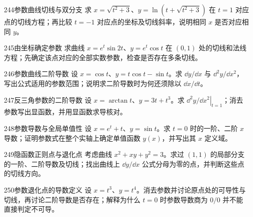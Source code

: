 \begin{exercise}{244}{参数曲线切线与双分支}
求 $x=\sqrt{t^2+3}$、$y=\ln(t+\sqrt{t^2+3})$ 在 $t=1$ 对应点的切线方程；再比较 $t=-1$ 对应点的坐标及切线斜率，说明相同 $x$ 是否对应相同 $y$。
\end{exercise}
\begin{exercise}{245}{由坐标确定参数}
求曲线 $x=e^t\sin2t$、$y=e^t\cos t$ 在 $(0,1)$ 处的切线和法线方程；先确定该点对应的全部实数参数，检查是否存在多条切线。
\end{exercise}
\begin{exercise}{246}{参数曲线二阶导数}
设 $x=\cos t$、$y=t\cos t-\sin t$。求 $\dd y/\dd x$ 与 $\dd^2y/\dd x^2$，写出公式适用的参数范围；说明求二阶导数时为何还须除以 $\dd x/\dd t$。
\end{exercise}
\begin{exercise}{247}{反三角参数的二阶导数}
设 $x=\arctan t$、$y=3t+t^3$。求 $\left.\dd^2y/\dd x^2\right|_{t=1}$；消去参数写出显函数，并用显函数求导核对。
\end{exercise}
\begin{exercise}{248}{参数导数与全局单值性}
设 $x=e^t+t$、$y=\sin t$。求 $t=0$ 时的一阶、二阶 $x$ 导数；证明参数式在整个实轴上确定单值函数 $y(x)$，并写出其 $x$ 定义域。
\end{exercise}
\begin{exercise}{249}{隐函数正则点与退化点}
考虑曲线 $x^2+xy+y^2=3$。求过 $(1,1)$ 的局部分支的一阶、二阶导数及切线；找出曲线上 $\dd y/\dd x$ 公式分母为零的点，并判断这些点的切线方向。
\end{exercise}
\begin{exercise}{250}{参数退化点的导数定义}
设 $x=t^3$、$y=t^4$。消去参数并讨论原点处的可导性与切线，再讨论二阶导数是否存在；解释为什么 $t=0$ 时参数导数商为 $0/0$ 并不能直接判定不可导。
\end{exercise}
